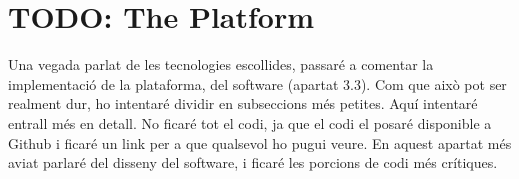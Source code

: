 
\section{TODO: The Platform}

Una vegada parlat de les tecnologies escollides, passaré a comentar la
implementació de la plataforma, del software (apartat 3.3). Com que això pot
ser realment dur, ho intentaré dividir en subseccions més petites. Aquí
intentaré entrall més en detall. No ficaré tot el codi, ja que el codi el
posaré disponible a Github i ficaré un link per a que qualsevol ho pugui veure.
En aquest apartat més aviat parlaré del disseny del software, i ficaré les
porcions de codi més crítiques.
